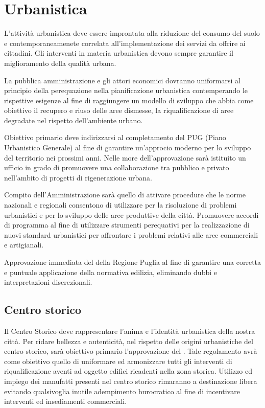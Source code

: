 \documentclass[a4paper,14pt,italian]{sphinxmanual}
\begin{document}
\chapter{Urbanistica}
\label{\detokenize{urbanistica:urbanistica}}\label{\detokenize{urbanistica::doc}}

L’attività urbanistica deve essere improntata alla riduzione del consumo del suolo e contemporaneamenete correlata all’implementazione dei servizi da offrire ai cittadini.
Gli interventi in materia urbanistica devono sempre garantire il miglioramento della qualità urbana.

La pubblica amministrazione e gli attori economici dovranno uniformarsi al principio della perequazione nella pianificazione urbanistica contemperando le rispettive esigenze al fine di raggiungere un modello di sviluppo che abbia come obiettivo il recupero e riuso delle aree dismesse, la riqualificazione di aree degradate nel rispetto dell’ambiente urbano.

Obiettivo primario deve indirizzarsi al completamento del PUG (Piano Urbanistico Generale) al fine di garantire un’approcio moderno per lo sviluppo del territorio nei prossimi anni.
Nelle more dell’approvazione sarà istituito un ufficio in grado di promuovere una collaborazione tra pubblico e privato nell’ambito di progetti di rigenerazione urbana.

Compito dell’Amministrazione sarà quello di attivare procedure che le norme nazionali e regionali consentono di utilizzare per la risoluzione di problemi urbanistici e per lo sviluppo delle aree produttive della città.
Promuovere accordi di programma al fine di utilizzare strumenti perequativi per la realizzazione di nuovi standard urbanistici per affrontare i problemi relativi alle aree commerciali e artigianali.

Approvazione immediata del  della Regione Puglia al fine di garantire una corretta e puntuale applicazione della normativa edilizia, eliminando dubbi e interpretazioni discrezionali.


\section{Centro storico}
\label{\detokenize{urbanistica:centro-storico}}
Il Centro Storico deve rappresentare l’anima e l’identità urbanistica della nostra città.
Per ridare bellezza e autenticità, nel rispetto delle origini urbanistiche del centro storico, sarà obiettivo primario l’approvazione del .
Tale regolamento avrà come obiettivo quello di uniformare ed armonizzare tutti gli interventi di riqualificazione aventi ad oggetto edifici ricadenti nella zona storica.
Utilizzo ed impiego dei manufatti presenti nel centro storico rimaranno a destinazione libera evitando qualsivoglia inutile adempimento burocratico al fine di incentivare interventi ed insediamenti commerciali.
\end{document}
